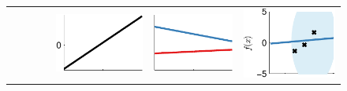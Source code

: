 \begin{figure}
\begin{tabular}{ccccc|c|c}
& & & & \includegraphics[width=\fw]{../figures/structure_examples/lin_kernel} &  \includegraphics[width=\fw]{../figures/structure_examples/lin_kernel_draws} & \includegraphics[width=\fw]{../figures/structure_examples/lin_kernel_post} \\

\end{tabular}
\end{figure}
